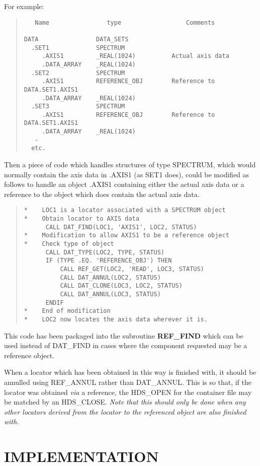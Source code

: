 For example:
\begin{quote}
\begin{verbatim}
   Name                type                  Comments

DATA                DATA_SETS
  .SET1             SPECTRUM
     .AXIS1         _REAL(1024)          Actual axis data
     .DATA_ARRAY    _REAL(1024)
  .SET2             SPECTRUM
     .AXIS1         REFERENCE_OBJ        Reference to DATA.SET1.AXIS1
     .DATA_ARRAY    _REAL(1024)
  .SET3             SPECTRUM
     .AXIS1         REFERENCE_OBJ        Reference to DATA.SET1.AXIS1
     .DATA_ARRAY    _REAL(1024)  
   -
  etc.
\end{verbatim}
\end{quote}
Then a piece of code which handles structures of type SPECTRUM, which would
normally contain the axis data in .AXIS1 (as SET1 does), could be modified as
follows to handle an object .AXIS1 containing either the actual axis data or
a reference to the object which does contain the actual axis data.
\begin{quote}
\begin{verbatim}
*    LOC1 is a locator associated with a SPECTRUM object
*    Obtain locator to AXIS data
      CALL DAT_FIND(LOC1, 'AXIS1', LOC2, STATUS)
*    Modification to allow AXIS1 to be a reference object
*    Check type of object
      CALL DAT_TYPE(LOC2, TYPE, STATUS)
      IF (TYPE .EQ. 'REFERENCE_OBJ') THEN
          CALL REF_GET(LOC2, 'READ', LOC3, STATUS)
          CALL DAT_ANNUL(LOC2, STATUS)
          CALL DAT_CLONE(LOC3, LOC2, STATUS)
          CALL DAT_ANNUL(LOC3, STATUS)
      ENDIF
*    End of modification
*    LOC2 now locates the axis data wherever it is.
\end{verbatim}
\end{quote}
This code has been packaged into the subroutine {\bf REF\_FIND} which can be
used instead of DAT\_FIND in cases where the component requested may be a
reference object.

When a locator which has been obtained in this way is finished with, it should
be annulled using REF\_ANNUL rather than DAT\_ANNUL. 
This is so that, if the locator was obtained {\em via} a reference, the
HDS\_OPEN for the container file may be matched by an HDS\_CLOSE.
{\em Note that this should only be done when any other locators derived from
the locator to the referenced object are also finished with.}

\section{IMPLEMENTATION}

